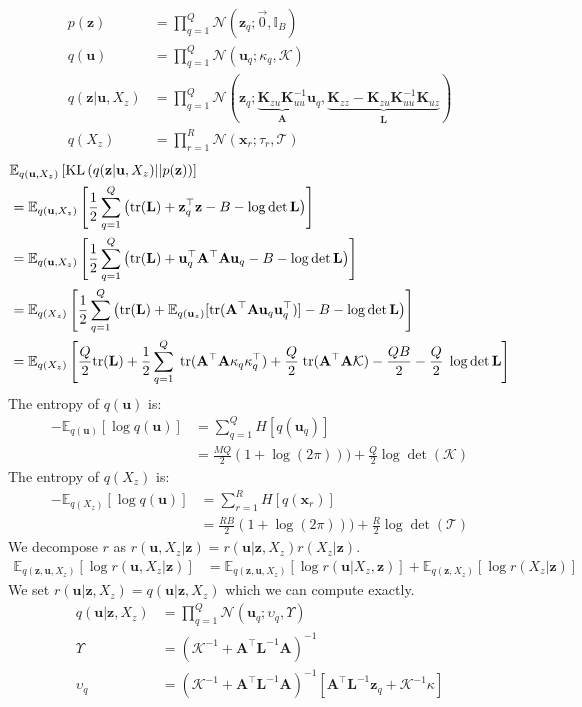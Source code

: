 \documentclass[12pt]{article}
\newcommand{\Tau}{\mathcal{T}}
\newcommand{\Kappa}{\mathcal{K}}
\newcommand{\xb}{\mathbf{x}}
\newcommand{\ub}{\mathbf{u}}
\newcommand{\zb}{\mathbf{z}}
\newcommand{\Lb}{\mathbf{L}}
\newcommand{\Ab}{\mathbf{A}}
\newcommand{\Kzz}{\mathbf{K}_{zz}}
\newcommand{\Kuu}{\mathbf{K}_{uu}}
\newcommand{\Kuz}{\mathbf{K}_{uz}}
\newcommand{\Kzu}{\mathbf{K}_{zu}}
\newcommand{\Ex}{\mathbb{E}}
\newcommand{\KL}{\mathrm{KL}}
\newcommand{\tr}{\mathrm{tr}}
\begin{document}
\begin{align}
p(\zb) &= \prod_{q=1}^Q \mathcal{N}(\zb_q; \vec{0}, \mathbb{I}_B) \\
q(\ub) &= \prod_{q=1}^Q \mathcal{N}(\ub_q; \kappa_q, \Kappa) \\
q(\zb|\ub,X_z) &= \prod_{q=1}^Q \mathcal{N}(\zb_q; \underbrace{\Kzu\Kuu^{-1}}_{\Ab}\ub_q, \underbrace{\Kzz-\Kzu\Kuu^{-1}\Kuz}_{\Lb}) \\
q(X_z) &= \prod_{r=1}^R \mathcal{N}(\xb_r; \tau_r, \Tau)
\end{align}
%
\begin{align}
&\Ex_{q(\ub,X_z)}\left[\KL\left(q(\zb|\ub,X_z)||p(\zb)\right)\right] \notag \\
&= \Ex_{q(\ub,X_z)}\left[\frac{1}{2}\sum_{q=1}^Q \left(\tr(\Lb) + \zb_q^\top\zb - B -  \log\det\Lb \right)\right] \\
&= \Ex_{q(\ub,X_z)}\left[\frac{1}{2}\sum_{q=1}^Q \left(\tr(\Lb) + \ub_q^\top\Ab^\top\Ab\ub_q - B -  \log\det\Lb \right)\right] \\
&=\Ex_{q(X_z)}\left[\frac{1}{2}\sum_{q=1}^Q \left(\tr(\Lb) + \Ex_{q(\ub_z)}[\tr(\Ab^\top\Ab\ub_q\ub_q^\top)] - B -  \log\det\Lb \right)\right] \\
&=\Ex_{q(X_z)}\left[\frac{Q}{2}\tr(\Lb) + \frac{1}{2}\sum_{q=1}^Q\;\tr(\Ab^\top\Ab\kappa_q\kappa_q^\top) + \frac{Q}{2}\;\tr(\Ab^\top\Ab\Kappa) - \frac{QB}{2} -  \frac{Q}{2}\;\log\det\Lb \right]
\end{align}
%
The entropy of $q(\ub)$ is:
%
\begin{align}
-\Ex_{q(\ub)}\left[\log q(\ub)\right] &= \sum_{q=1}^Q H[q(\ub_q)] \\
&= \frac{MQ}{2}(1+\log(2\pi))) + \frac{Q}{2}\log\det(\Kappa)
\end{align}
%
The entropy of $q(X_z)$ is:
%
\begin{align}
-\Ex_{q(X_z)}\left[\log q(\ub)\right] &= \sum_{r=1}^R H[q(\xb_r)] \\
&= \frac{RB}{2}(1+\log(2\pi))) + \frac{R}{2}\log\det(\Tau)
\end{align}
%
We decompose $r$ as $r(\ub,X_z|\zb) = r(\ub|\zb,X_z)r(X_z|\zb)$. 
%
\begin{align}
\Ex_{q(\zb,\ub,X_z)}\left[\log r(\ub,X_z|\zb)\right] &= \Ex_{q(\zb,\ub,X_z)}\left[\log r(\ub|X_z,\zb)\right] + \Ex_{q(\zb,X_z)}\left[\log r(X_z|\zb)\right] 
\end{align}
%
We set $r(\ub|\zb,X_z) = q(\ub|\zb,X_z)$ which we can compute exactly.
%
\begin{align}
q(\ub|\zb,X_z) &= \prod_{q=1}^Q \mathcal{N}(\ub_q; \upsilon_q, \Upsilon) \\
\Upsilon &= (\Kappa^{-1} + \Ab^\top\Lb^{-1}\Ab)^{-1} \\
\upsilon_q &= (\Kappa^{-1} + \Ab^\top\Lb^{-1}\Ab)^{-1}[\Ab^\top \Lb^{-1}\zb_q + \Kappa^{-1}\kappa]
\end{align}
\end{document}
